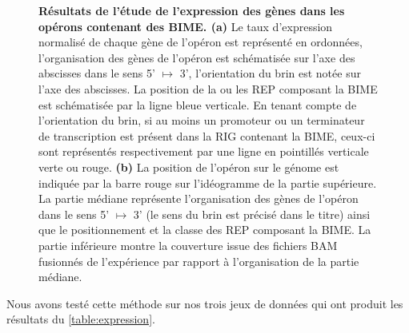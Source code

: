 \documentclass[12pt,a4paper]{report}
\begin{document}
\begin{onehalfspace}
\begin{figure}[h]
\caption{\textbf{Résultats de l'étude de l'expression des gènes dans les opérons contenant des BIME. (a)} Le taux d'expression normalisé de chaque gène de l'opéron est représenté en ordonnées, l'organisation des gènes de l'opéron est schématisée sur l'axe des abscisses dans le sens 5' $\mapsto$ 3', l'orientation du brin est notée sur l'axe des abscisses. La position de la ou les REP composant la BIME est schématisée par la ligne bleue verticale. En tenant compte de l'orientation du brin, si au moins un promoteur ou un terminateur de transcription est présent dans la RIG contenant la BIME, ceux-ci sont représentés respectivement par une ligne en pointillés verticale verte ou rouge. \textbf{(b)} La position de l'opéron sur le génome est indiquée par la barre rouge sur l'idéogramme de la partie supérieure. La partie médiane représente l'organisation des gènes de l'opéron dans le sens 5' $\mapsto$ 3' (le sens du brin est précisé dans le titre) ainsi que le positionnement et la classe des REP composant la BIME. La partie inférieure montre la couverture issue des fichiers BAM fusionnés de l'expérience par rapport à l'organisation de la partie médiane.}
\label{fig:expression} 
\end{figure}

Nous avons testé cette méthode sur nos trois jeux de données qui ont produit les résultats du \autoref{table:expression}.


\end{onehalfspace}
\end{document}
